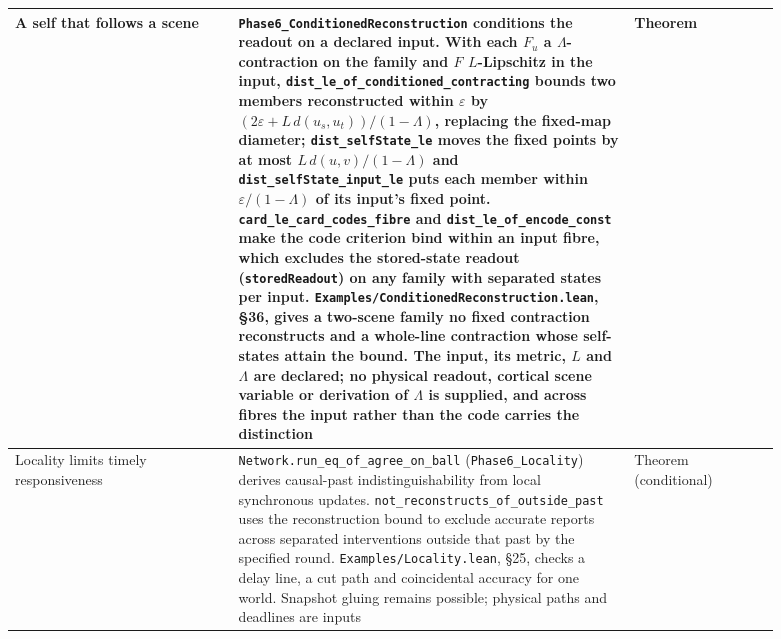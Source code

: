 \documentclass{article}
\begin{document}
\begin{longtable}{|>{\raggedright\arraybackslash}p{0.26\linewidth}|>{\raggedright\arraybackslash}p{0.46\linewidth}|>{\raggedright\arraybackslash}p{0.17\linewidth}|}
A self that follows a scene & \nolinkurl{Phase6_ConditionedReconstruction} conditions the readout on a declared input. With each $F_u$ a $\Lambda$-contraction on the family and $F$ $L$-Lipschitz in the input, \nolinkurl{dist_le_of_conditioned_contracting} bounds two members reconstructed within $\varepsilon$ by $(2\varepsilon+L\,d(u_s,u_t))/(1-\Lambda)$, replacing the fixed-map diameter; \nolinkurl{dist_selfState_le} moves the fixed points by at most $L\,d(u,v)/(1-\Lambda)$ and \nolinkurl{dist_selfState_input_le} puts each member within $\varepsilon/(1-\Lambda)$ of its input's fixed point. \nolinkurl{card_le_card_codes_fibre} and \nolinkurl{dist_le_of_encode_const} make the code criterion bind within an input fibre, which excludes the stored-state readout (\texttt{storedReadout}) on any family with separated states per input. \nolinkurl{Examples/ConditionedReconstruction.lean}, \S36, gives a two-scene family no fixed contraction reconstructs and a whole-line contraction whose self-states attain the bound. The input, its metric, $L$ and $\Lambda$ are declared; no physical readout, cortical scene variable or derivation of $\Lambda$ is supplied, and across fibres the input rather than the code carries the distinction & Theorem \\ \hline
Locality limits timely responsiveness & \nolinkurl{Network.run_eq_of_agree_on_ball} (\nolinkurl{Phase6_Locality}) derives causal-past indistinguishability from local synchronous updates. \nolinkurl{not_reconstructs_of_outside_past} uses the reconstruction bound to exclude accurate reports across separated interventions outside that past by the specified round. \nolinkurl{Examples/Locality.lean}, \S25, checks a delay line, a cut path and coincidental accuracy for one world. Snapshot gluing remains possible; physical paths and deadlines are inputs & Theorem (conditional) \\ \hline

\end{longtable}
\end{document}
